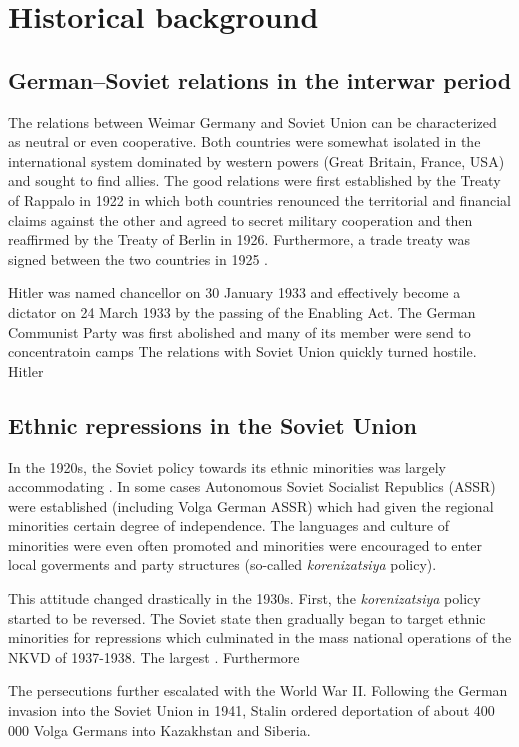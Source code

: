 \documentclass[12pt]{article}
\begin{document}
\section{Historical background}
\subsection{German–Soviet relations in the interwar period}
The relations between Weimar Germany and Soviet Union can be characterized as neutral or even cooperative. Both countries were somewhat isolated in the international system dominated by western powers (Great Britain, France, USA) and sought to find allies. The good relations were first established by the Treaty of Rappalo in 1922 in which both countries renounced the territorial and financial claims against the other and agreed to secret military cooperation and then reaffirmed by the Treaty of Berlin in 1926. Furthermore, a trade treaty was signed between the two countries in 1925 \citep{morgan_political_1963}.

Hitler was named chancellor on 30 January 1933 and effectively become a dictator on 24 March 1933 by the passing of the Enabling Act. The German Communist Party was first abolished and many of its member were send to concentratoin camps
The relations with Soviet Union quickly turned hostile. Hitler 

\subsection{Ethnic repressions in the Soviet Union}
In the 1920s, the Soviet policy towards its ethnic minorities was largely accommodating \citep{martin_affirmative_2001}. In some cases Autonomous Soviet Socialist Republics (ASSR) were established (including Volga German ASSR) which had given the regional minorities certain degree of independence. The languages and culture of minorities were even often promoted and minorities were encouraged to enter local goverments and party structures (so-called \emph{korenizatsiya} policy). 

This attitude changed drastically in the 1930s. First, the  \emph{korenizatsiya} policy started to be reversed. The Soviet state then gradually  began to target ethnic minorities for repressions  which culminated in the mass national operations of the NKVD of 1937-1938. The largest \citep{snyder_bloodlands:_2011}. Furthermore 

The persecutions further escalated with the World War II. Following the German invasion into the Soviet Union in 1941, Stalin ordered deportation of about 400 000 Volga Germans into Kazakhstan and Siberia. 
\end{document}
